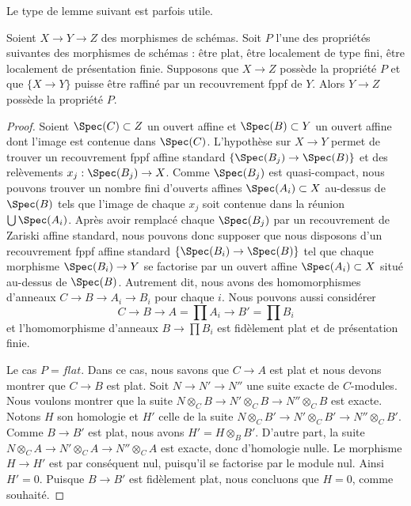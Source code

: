 \noindent
Le type de lemme suivant est parfois utile.

\begin{lemma}
\label{lemma-curiosity}
Soient $X \to Y \to Z$ des morphismes de schémas.
Soit $P$ l'une des propriétés suivantes des morphismes de schémas :
être plat, être localement de type fini, être localement de présentation
finie. Supposons que $X \to Z$ possède la propriété $P$ et que
$\{X \to Y\}$ puisse être raffiné par un recouvrement fppf de $Y$.
Alors $Y \to Z$ possède la propriété $P$.
\end{lemma}

\begin{proof}
Soient $\Spec(C) \subset Z$ un ouvert affine et
$\Spec(B) \subset Y$ un ouvert affine dont l'image est contenue dans
$\Spec(C)$. L'hypothèse sur $X \to Y$ permet de trouver un recouvrement
fppf affine standard $\{\Spec(B_j) \to \Spec(B)\}$ et des relèvements
$x_j : \Spec(B_j) \to X$. Comme $\Spec(B_j)$ est quasi-compact, nous
pouvons trouver un nombre fini d'ouverts affines
$\Spec(A_i) \subset X$ au-dessus de $\Spec(B)$ tels que l'image de
chaque $x_j$ soit contenue dans la réunion $\bigcup \Spec(A_i)$.
Après avoir remplacé chaque $\Spec(B_j)$ par un recouvrement de Zariski
affine standard, nous pouvons donc supposer que nous disposons d'un
recouvrement fppf affine standard
$\{\Spec(B_i) \to \Spec(B)\}$ tel que chaque morphisme
$\Spec(B_i) \to Y$ se factorise par un ouvert affine
$\Spec(A_i) \subset X$ situé au-dessus de $\Spec(B)$. Autrement dit,
nous avons des homomorphismes d'anneaux $C \to B \to A_i \to B_i$
pour chaque $i$. Nous pouvons aussi considérer
$$
C \to B \to A = \prod A_i \to B' = \prod B_i
$$
et l'homomorphisme d'anneaux $B \to \prod B_i$ est fidèlement plat et
de présentation finie.

\medskip\noindent
Le cas $P = flat$. Dans ce cas, nous savons que $C \to A$ est plat et
nous devons montrer que $C \to B$ est plat. Soit
$N \to N' \to N''$ une suite exacte de $C$-modules. Nous voulons
montrer que la suite
$N \otimes_C B \to N' \otimes_C B \to N'' \otimes_C B$ est exacte.
Notons $H$ son homologie et $H'$ celle de la suite
$N \otimes_C B' \to N' \otimes_C B' \to N'' \otimes_C B'$.
Comme $B \to B'$ est plat, nous avons $H' = H \otimes_B B'$.
D'autre part, la suite
$N \otimes_C A \to N' \otimes_C A \to N'' \otimes_C A$ est exacte,
donc d'homologie nulle. Le morphisme $H \to H'$ est par conséquent
nul, puisqu'il se factorise par le module nul. Ainsi $H' = 0$.
Puisque $B \to B'$ est fidèlement plat, nous concluons que $H = 0$,
comme souhaité.


\end{proof}
